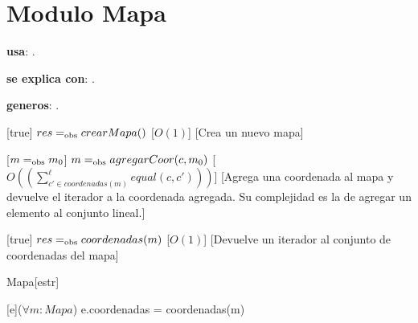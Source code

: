 \section{Modulo Mapa}


\begin{Interfaz}

  \textbf{usa}: .

  \textbf{se explica con}: .

  \textbf{generos}: .

  [true]
  {$res =_{\mathrm{obs}} crearMapa()$}
  [$O(1)$]
  [Crea un nuevo mapa]

  [$m =_{\mathrm{obs}} m_0$]
  {$m =_{\mathrm{obs}} agregarCoor(c, m_0)$}
  [$O(\left(\sum_{c' \in coordenadas(m)}^{\ell}{equal(c, c')}\right))$]
  [Agrega una coordenada al mapa y devuelve el iterador a la coordenada agregada. Su complejidad es la de agregar un elemento al conjunto lineal.]

  [true]
  {$res =_{\mathrm{obs}} coordenadas(m)$}
  [$O(1)$]
  [Devuelve un iterador al conjunto de coordenadas del mapa]
    
\end{Interfaz}

\begin{Representacion}
	\begin{Estructura}{Mapa}[estr]
		\begin{Tupla}[estr]
		\end{Tupla}
	\end{Estructura}
	
	{($\forall m : Mapa$) e.coordenadas = coordenadas(m)}

\end{Representacion}

